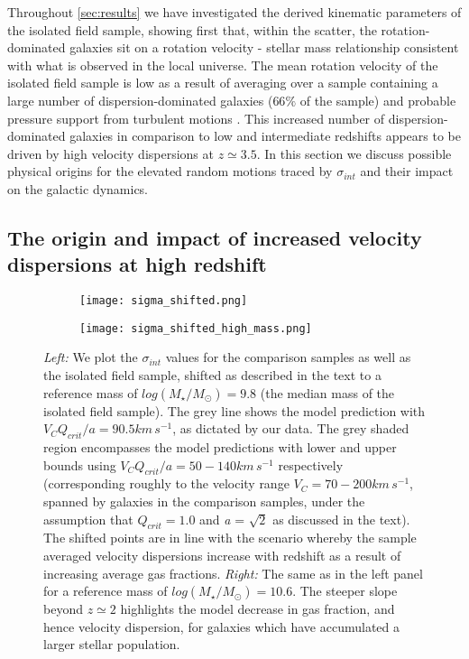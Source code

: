 \documentclass[fleqn,usenatbib]{mnras}
\begin{document}
Throughout \cref{sec:results} we have investigated the derived kinematic parameters of the isolated field sample, showing first that, within the scatter, the rotation-dominated galaxies sit on a rotation velocity - stellar mass relationship consistent with what is observed in the local universe.
The mean rotation velocity of the isolated field sample is low as a result of averaging over a sample containing a large number of dispersion-dominated galaxies ($66\%$ of the sample) and probable pressure support from turbulent motions \citep[e.g.][]{Burkert2010}.
This increased number of dispersion-dominated galaxies in comparison to low and intermediate redshifts appears to be driven by high velocity dispersions at $z\simeq3.5$.
In this section we discuss possible physical origins for the elevated random motions traced by $\sigma_{int}$ and their impact on the galactic dynamics.

\subsection{The origin and impact of increased velocity dispersions at high redshift}\label{discussion_increase_in_sigma}

\begin{figure*}
    \centering \hspace{-1.3cm}
    \begin{subfigure}[h!]{0.5\textwidth}
        \centering
        \texttt{[image: sigma\_shifted.png]}
    \end{subfigure} \hspace{+0.4cm}
    \begin{subfigure}[h!]{0.5\textwidth}
        \centering
        \texttt{[image: sigma\_shifted\_high\_mass.png]}
    \end{subfigure}
    \caption{{\it Left:} We plot the $\sigma_{int}$ values for the comparison samples as well as the isolated field sample, shifted as described in the text to a reference mass of $log(M_{\star}/M_{\odot}) = 9.8$ (the median mass of the isolated field sample).
    The grey line shows the model prediction with $V_{C}Q_{crit}/a = 90.5km\,s^{-1}$, as dictated by our data.
    The grey shaded region encompasses the model predictions with lower and upper bounds using $V_{C}Q_{crit}/a = 50-140km\,s^{-1}$ respectively (corresponding roughly to the velocity range $V_{C} = 70-200km\,s^{-1}$, spanned by galaxies in the comparison samples, under the assumption that $Q_{crit} = 1.0$ and {\it a} = $\sqrt{2}$ as discussed in the text).
    The shifted points are in line with the scenario whereby the sample averaged velocity dispersions increase with redshift as a result of increasing average gas fractions. 
    {\it Right:} The same as in the left panel for a reference mass of $log(M_{\star}/M_{\odot}) = 10.6$.
    The steeper slope beyond $z\simeq2$ highlights the model decrease in gas fraction, and hence velocity dispersion, for galaxies which have accumulated a larger stellar population.}
    \label{fig:sigma_shifted}
\end{figure*}
\end{document}
